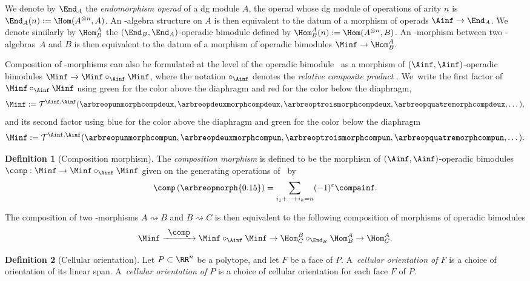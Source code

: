 \documentclass[JEP,XML,SOM,NoFloatCountersInSection,Unicode,published]{cedram}
\def\To#1{\mathchoice{\xrightarrow{\textstyle\kern4pt#1\kern3pt}}{\stackrel{#1}{\longrightarrow}}{}{}}
\theoremstyle{definition}
\newtheorem{definition}{Definition}[section]
\theoremstyle{plain}
\begin{document}
We denote by $\End_A$ the \textit{endomorphism operad} of a dg module $A$, \ie the operad whose dg module of operations of arity $n$ is $\End_A(n) := \Hom (A^{\otimes n},A)$.
An \Ainf\nobreakdash-alge\-bra structure on $A$ is then equivalent to the datum of a morphism of operads $\Ainf \to \End_A$.
We denote similarly by $\Hom^A_B$ the $(\End_B, \End_A)$-operadic bimodule defined by $ \Hom^A_B(n) := \Hom (A^{\otimes n},B)$.
An \Ainf -morphism between two \Ainf\nobreakdash-alge\-bras~$A$ and $B$ is then equivalent to the datum of a morphism of operadic bimodules $\Minf \to \Hom^A_B$.

Composition of \Ainf -morphisms can also be formulated at the level of the operadic bimodule \Minf\ as a morphism of $(\Ainf, \Ainf)$-operadic bimodules $\Minf \to \Minf \circ_{\Ainf} \Minf$, where the notation $\circ_{\Ainf}$ denotes the \emph{relative composite product} \cite[\S 11.2.1]{LodayVallette12}.
We~write the first factor of $\Minf \circ_{\Ainf} \Minf$ using green for the color above the diaphragm and red for the color below the diaphragm,
\[
\Minf := \mathcal{T}^{\Ainf, \Ainf}(\arbreopunmorphcompdeux, \arbreopdeuxmorphcompdeux, \arbreoptroismorphcompdeux, \arbreopquatremorphcompdeux,\dots),
\]
and its second factor using blue for the color above the diaphragm and green for the color below the diaphragm
\[
\Minf := \mathcal{T}^{\Ainf, \Ainf}(\arbreopunmorphcompun, \arbreopdeuxmorphcompun, \arbreoptroismorphcompun, \arbreopquatremorphcompun,\dots).
\]

\begin{definition}[Composition morphism]
The \emph{composition morphism} is defined to be the morphism of $(\Ainf,\Ainf)$-operadic bimodules $\comp : \Minf \to \Minf \circ_{\Ainf} \Minf$ given on the generating operations of \Minf\ by
\[
\comp \left(\arbreopmorph{0.15} \right) = \sum_{i_1+\cdots+i_k=n} (-1)^{\varepsilon} \compainf.
\]
\end{definition}

The composition of two \Ainf -morphisms $A \rightsquigarrow B$ and $B \rightsquigarrow C$ is then equivalent to the following composition of morphisms of operadic bimodules
\[
\Minf \To{\comp} \Minf \circ_{\Ainf} \Minf \to \Hom^B_C \circ_{\End_B} \Hom^A_B \to \Hom^A_C.
\]

 \label{sss:forcey--loday-realize}

\begin{definition}[Cellular orientation]

Let $P\subset\RR^n$ be a polytope, and let $F$ be a face of $P$. A~\emph{cellular orientation of $F$} is a choice of orientation of its linear span. A~\emph{cellular orientation of $P$} is a choice of cellular orientation for each face $F$ of $P$.
\end{definition}
\end{document}
